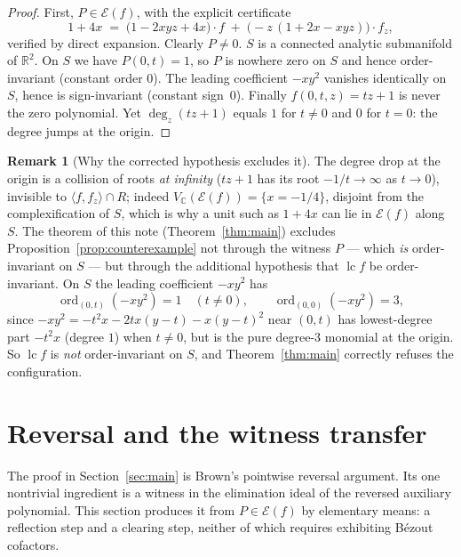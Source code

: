 \documentclass[11pt,a4paper]{article}
\theoremstyle{definition}
\newtheorem{remark}[theorem]{Remark}
\newcommand{\R}{\mathbb{R}}
\newcommand{\C}{\mathbb{C}}
\newcommand{\lc}{\operatorname{lc}}
\newcommand{\ord}{\operatorname{ord}}
\newcommand{\E}{\mathcal{E}}
\newcommand{\ideal}[1]{\langle #1\rangle}
\begin{document}
\begin{proof}
First, $P \in \E(f)$, with the explicit certificate
\begin{equation}\label{eq:certificate}
  1 + 4x \;=\; \bigl(1 - 2xyz + 4x\bigr)\cdot f \;+\;
               \bigl(-z\,(1 + 2x - xyz)\bigr)\cdot f_z ,
\end{equation}
verified by direct expansion. Clearly $P \neq 0$. $S$ is a connected analytic
submanifold of $\R^2$. On $S$ we have $P(0,t) = 1$, so $P$ is nowhere zero on
$S$ and hence order-invariant (constant order $0$). The leading coefficient
$-xy^2$ vanishes identically on $S$, hence is sign-invariant (constant
sign~$0$). Finally $f(0,t,z) = tz + 1$ is never the zero polynomial. Yet
$\deg_z (tz+1)$ equals $1$ for $t \neq 0$ and $0$ for $t = 0$: the degree jumps
at the origin.
\end{proof}

\begin{remark}[Why the corrected hypothesis excludes it]\label{rem:cex}
The degree drop at the origin is a collision of roots \emph{at infinity}
($tz+1$ has its root $-1/t \to \infty$ as $t \to 0$), invisible to
$\ideal{f,f_z} \cap R$; indeed $V_\C(\E(f)) = \{x = -1/4\}$, disjoint from the
complexification of $S$, which is why a unit such as $1+4x$ can lie in $\E(f)$
along $S$. The theorem of this note (Theorem~\ref{thm:main}) excludes
Proposition~\ref{prop:counterexample} not through the witness $P$ --- which
\emph{is} order-invariant on $S$ --- but through the additional hypothesis that
$\lc f$ be order-invariant. On $S$ the leading coefficient $-xy^2$ has
\[
  \ord_{(0,t)}(-xy^2) = 1 \quad (t \neq 0), \qquad
  \ord_{(0,0)}(-xy^2) = 3 ,
\]
since $-xy^2 = -t^2 x - 2tx(y-t) - x(y-t)^2$ near $(0,t)$ has lowest-degree
part $-t^2 x$ (degree $1$) when $t\neq0$, but is the pure degree-$3$ monomial
at the origin. So $\lc f$ is \emph{not} order-invariant on $S$, and
Theorem~\ref{thm:main} correctly refuses the configuration.
\end{remark}

\section{Reversal and the witness transfer}\label{sec:transfer}

The proof in Section~\ref{sec:main} is Brown's pointwise reversal argument. Its
one nontrivial ingredient is a witness in the elimination ideal of the reversed
auxiliary polynomial. This section produces it from $P \in \E(f)$ by elementary
means: a reflection step and a clearing step, neither of which requires
exhibiting B\'ezout cofactors.
\end{document}

